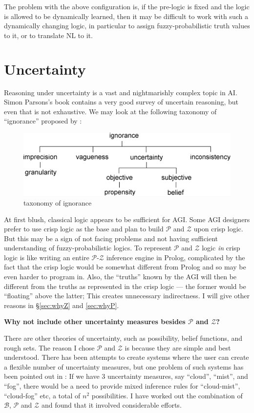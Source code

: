 The problem with the above configuration is, if the pre-logic is fixed and the logic is allowed to be dynamically learned, then it may be difficult to work with such a dynamically changing logic, in particular to assign fuzzy-probabilistic truth values to it, or to translate NL to it.

\section{Uncertainty}

Reasoning under uncertainty is a vast and nightmarishly complex topic in AI.  Simon Parsons's book \citep*{Parsons2001} contains a very good survey of uncertain reasoning, but even that is not exhaustive.  We may look at the following taxonomy of ``ignorance'' proposed by \citep*{Bosc1997}:
\begin{figure}[H]
\centering
\includegraphics[scale=0.7]{IgnoranceTaxonomy.png}
\caption{taxonomy of ignorance}
\end{figure}

At first blush, classical logic appears to be sufficient for AGI.  Some AGI designers prefer to use crisp logic as the base and plan to build $\mathcal{P}$ and $\mathcal{Z}$ upon crisp logic.  But this may be a sign of not facing problems and not having sufficient understanding of fuzzy-probabilistic logics.  To represent $\mathcal{P}$ and $\mathcal{Z}$ logic \textit{in} crisp logic is like writing an entire $\mathcal{P}$-$\mathcal{Z}$ inference engine in Prolog, complicated by the fact that the crisp logic would be somewhat different from Prolog and so may be even harder to program in.  Also, the ``truths'' known by the AGI will then be different from the truths as represented in the crisp logic --- the former would be ``floating'' above the latter;  This creates unnecessary indirectness.  I will give other reasons in \S\ref{sec:whyZ} and \ref{sec:whyP}.

\textbf{Why not include other uncertainty measures besides $\mathcal{P}$ and $\mathcal{Z}$?}

There are other theories of uncertainty, such as possibility, belief functions, and rough sets.  The reason I chose $\mathcal{P}$ and $\mathcal{Z}$ is because they are simple and best understood.  There has been attempts to create systems where the user can create a flexible number of uncertainty measures, but one problem of such systems has been pointed out in \citep*{Parsons2001}:  If we have 3 uncertainty measures, say ``cloud'', ``mist'', and ``fog'', there would be a need to provide mixed inference rules for ``cloud-mist'', ``cloud-fog'' etc, a total of $n^2$ possibilities.  I have worked out the combination of $\mathcal{B}$, $\mathcal{P}$ and $\mathcal{Z}$ and found that it involved considerable efforts.

